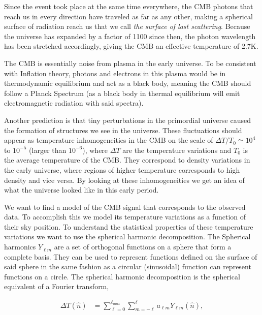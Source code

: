 \documentclass{emulateapj}
\begin{document}
Since the event took place at the same time everywhere, the CMB photons that reach us in every direction have traveled as far as any other, making a spherical surface of radiation reach us that we call \textit{the surface of last scattering}. Because the universe has expanded by a factor of 1100 since then, the photon wavelength has been stretched accordingly, giving the CMB an effective temperature of 2.7K.   

The CMB is essentially noise from plasma in the early universe. To be consistent with Inflation theory, photons and electrons in this plasma would be in thermodynamic equilibrium and act as a black body, meaning the CMB should follow a Planck Spectrum (as a black body in thermal equilibrium will emit electromagnetic radiation with said spectra).   

Another prediction is that tiny perturbations in the primordial universe caused the formation of structures we see in the universe. These fluctuations should appear as temperature inhomogeneities in the CMB on the scale of $\Delta T / T_0 \simeq 10^{4}$ to $10^{-5}$ (larger than $10^{-6}$), where $\Delta T$  are the temperature variations and $T_0$ is the average temperature of the CMB. They correspond to density variations in the early universe, where regions of higher temperature corresponds to high density and vice versa. By looking at these inhomogeneities we get an idea of what the universe looked like in this early period.  



\vspace{5mm}
We want to find a model of the CMB signal that corresponds to the observed data. To accomplish this we model its temperature variations as a function of their sky position. To understand the statistical properties of these temperature variations we want to use the spherical harmonic decomposition. The Spherical harmonics $Y_{\ell m}$ are a set of orthogonal functions on a sphere that form a complete basis. They can be used to represent functions defined on the surface of said sphere in the same fashion as a circular (sinusoidal) function can represent functions on a circle. The spherical harmonic decomposition is the spherical equivalent of a Fourier transform,

 \begin{equation}
 \label{dTn}
 \begin{array}{rl}
 \Delta T(\hat{n})  &= \sum_{\ell = 0}^{\ell_{max}} \sum_{m = -\ell}^{\ell} a_{\ell m}Y_{\ell m}(\hat{n}),\\
 \end{array}
 \end{equation}
\end{document}
